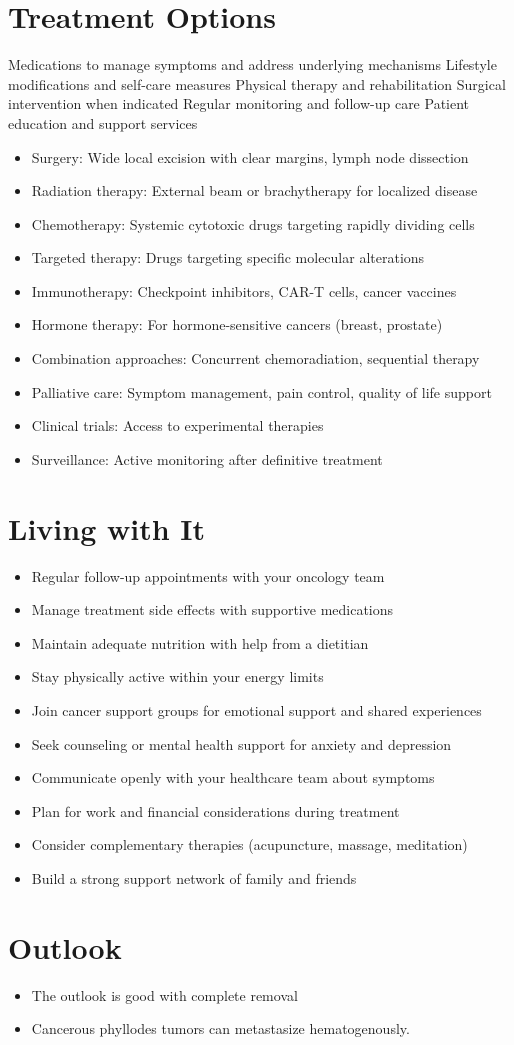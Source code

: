 \section{Treatment Options}
Medications to manage symptoms and address underlying mechanisms Lifestyle modifications and self-care measures Physical therapy and rehabilitation Surgical intervention when indicated Regular monitoring and follow-up care Patient education and support services

\begin{itemize}[noitemsep]
  \item Surgery: Wide local excision with clear margins, lymph node dissection
  \item Radiation therapy: External beam or brachytherapy for localized disease
  \item Chemotherapy: Systemic cytotoxic drugs targeting rapidly dividing cells
  \item Targeted therapy: Drugs targeting specific molecular alterations
  \item Immunotherapy: Checkpoint inhibitors, CAR-T cells, cancer vaccines
  \item Hormone therapy: For hormone-sensitive cancers (breast, prostate)
  \item Combination approaches: Concurrent chemoradiation, sequential therapy
  \item Palliative care: Symptom management, pain control, quality of life support
  \item Clinical trials: Access to experimental therapies
  \item Surveillance: Active monitoring after definitive treatment
\end{itemize}
\section{Living with It}
\begin{itemize}[noitemsep]
  \item Regular follow-up appointments with your oncology team
  \item Manage treatment side effects with supportive medications
  \item Maintain adequate nutrition with help from a dietitian
  \item Stay physically active within your energy limits
  \item Join cancer support groups for emotional support and shared experiences
  \item Seek counseling or mental health support for anxiety and depression
  \item Communicate openly with your healthcare team about symptoms
  \item Plan for work and financial considerations during treatment
  \item Consider complementary therapies (acupuncture, massage, meditation)
  \item Build a strong support network of family and friends
\end{itemize}
\section{Outlook}
\begin{itemize}[noitemsep]
  \item The outlook is good with complete removal
  \item Cancerous phyllodes tumors can metastasize hematogenously.
\end{itemize}
